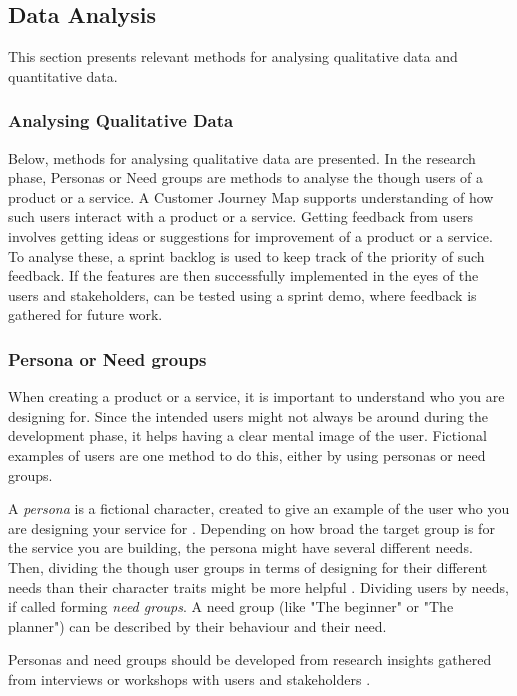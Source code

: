 \subsection{Data Analysis}\label{sec:data-analysis}

This section presents relevant methods for analysing qualitative data and quantitative data.

\subsubsection{Analysing Qualitative Data}

Below, methods for analysing qualitative data are presented. In the research phase, Personas or Need groups are methods to analyse the though users of a product or a service. A Customer Journey Map supports understanding of how such users interact with a product or a service. Getting feedback from users involves getting ideas or suggestions for improvement of a product or a service. To analyse these, a sprint backlog is used to keep track of the priority of such feedback. If the features are then successfully implemented in the eyes of the users and stakeholders, can be tested using a sprint demo, where feedback is gathered for future work.

\subsubsection{Persona or Need groups}
When creating a product or a service, it is important to understand who you are designing for. Since the intended users might not always be around during the development phase, it helps having a clear mental image of the user. Fictional examples of users are one method to do this, either by using personas or need groups.

A \textit{persona} is a fictional character, created to give an example of the user who you are designing your service for \citep{stickdorn}. Depending on how broad the target group is for the service you are building, the persona might have several different needs. Then, dividing the though user groups in terms of designing for their different needs than their character traits might be more helpful \citep{expedition-mondial}. Dividing users by needs, if called forming \textit{need groups}. A need group (like "The beginner" or "The planner") can be described by their behaviour and their need.

Personas and need groups should be developed from research insights gathered from interviews or workshops with users and stakeholders \citep{stickdorn}.

